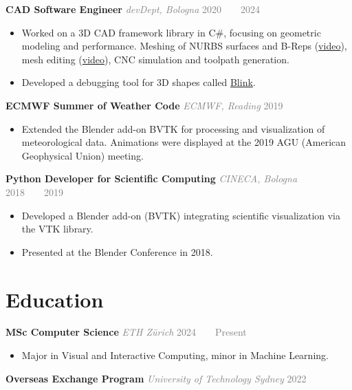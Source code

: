 \documentclass[11pt,a4paper]{article}
\newcommand{\entry}[3]{%
  \noindent\textbf{#1} 
  \textcolor{gray}{\textit{#2}}
  \hfill \textcolor{gray}{#3}\par\vspace{2pt}
}
\newcommand{\caret}{\ \ {\color{lightgray}\faCaretRight}\ \ }
\begin{document}
\entry{CAD Software Engineer}{devDept, Bologna}{2020\caret 2024}
\begin{itemize}[leftmargin=*,nosep]
  \item Worked on a 3D CAD framework library in C\#, focusing on geometric modeling and performance. Meshing of NURBS surfaces and B-Reps (\href{https://www.youtube.com/watch?v=tZCLl7WwqoM}{video}), mesh editing (\href{https://www.youtube.com/watch?v=23w_LPZiCwo}{video}), CNC simulation and toolpath generation.
  \item Developed a debugging tool for 3D shapes called \href{https://devdept.zendesk.com/hc/en-us/articles/19007089043996-Blink-Debugging-Tool}{Blink}.
\end{itemize}
\vspace{6pt}

\entry{ECMWF Summer of Weather Code}{ECMWF, Reading}{2019}
\begin{itemize}[leftmargin=*,nosep]
  \item Extended the Blender add-on BVTK for processing and visualization of meteorological data. Animations were displayed at the 2019 AGU (American Geophysical Union) meeting. 
\end{itemize}
\vspace{6pt}

\entry{Python Developer for Scientific Computing}{CINECA, Bologna}{2018\caret 2019}
\begin{itemize}[leftmargin=*,nosep]
  \item Developed a Blender add-on (BVTK) integrating scientific visualization via the VTK library.
  \item Presented at the Blender Conference in 2018.
\end{itemize}

\section{Education}

\entry{MSc Computer Science}{ETH Zürich}{2024\caret Present}
\begin{itemize}[leftmargin=*,nosep]
  \item Major in Visual and Interactive Computing, minor in Machine Learning.
\end{itemize}
\vspace{6pt}

\entry{Overseas Exchange Program}{University of Technology Sydney}{2022}
\vspace{6pt}
\end{document}
